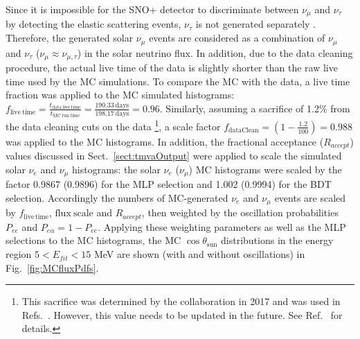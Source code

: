 Since it is impossible for the SNO+ detector to discriminate between $\nu_\mu$ and $\nu_\tau$ by detecting the elastic scattering events, $\nu_\tau$ is not generated separately \cite{marzec2019measurement}. Therefore, the generated solar $\nu_\mu$ events are considered as a combination of $\nu_\mu$ and $\nu_\tau$ ($\nu_\mu\approx\nu_{\mu,\tau}$) in the solar neutrino flux. In addition, due to the data cleaning procedure, the actual live time of the data is slightly shorter than the raw live time used by the MC simulations. To compare the MC with the data, a live time fraction was applied to the MC simulated histograms: $f_\mathrm{live~time}=\frac{t_\mathrm{data~live~time}}{t_\mathrm{MC~run~time}}=\frac{190.33~\mathrm{days}}{198.17~\mathrm{days}} = 0.96$. Similarly, assuming a sacrifice of 1.2\% from the data cleaning cuts on the data \footnote{This sacrifice was determined by the collaboration in 2017 \cite{waterunidoc,morganDataClean} and was used in Refs.~\cite{kaptanoglu2020reactor,marzec2019measurement}. However, this value needs to be updated in the future. See Ref.~\cite{dianaDataClean1} for details.}, a scale factor $f_\mathrm{dataClean}=(1-\frac{1.2}{100})=0.988$ was applied to the MC histograms. In addition, the fractional acceptance ($R_{accept}$) values discussed in Sect.~\ref{sect:tmvaOutput} were applied to scale the simulated solar $\nu_e$ and $\nu_\mu$ histograms: the solar $\nu_e$ ($\nu_\mu$) MC histograms were scaled by the factor 0.9867 (0.9896) for the MLP selection and 1.002 (0.9994) for the BDT selection. Accordingly the numbers of MC-generated $\nu_e$ and $\nu_\mu$ events are scaled by $f_\mathrm{live\, time}$, $\mathrm{flux~scale}$ and $R_{accept}$, then weighted by the oscillation probabilities $P_{ee}$ and $P_{e\alpha}=1-P_{ee}$. Applying these weighting parameters as well as the MLP selections to the MC histograms, the MC $\cos\theta_\mathrm{sun}$ distributions in the energy region $5<E_{fit}<15$ MeV are shown (with and without oscillations) in Fig.~\ref{fig:MCfluxPdfs}.

